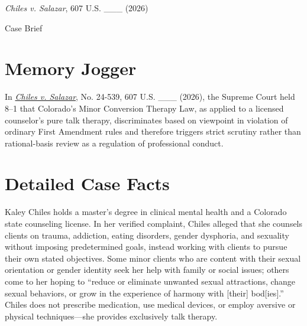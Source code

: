 \documentclass[12pt]{article}
\begin{document}
\begin{center}
{\LARGE \textit{Chiles v. Salazar}, 607 U.S. \_\_\_ (2026)\par}
\vspace{0.8em}
{\large Case Brief\par}
\end{center}
\vspace{1em}

\section{Memory Jogger}

In \href{https://www.courtlistener.com/opinion/10830655/chiles-v-salazar-revisions-33126/}{\textit{Chiles v. Salazar}}, No. 24-539, 607 U.S. \_\_\_ (2026), the Supreme Court held 8--1 that Colorado's Minor Conversion Therapy Law, as applied to a licensed counselor's pure talk therapy, discriminates based on viewpoint in violation of ordinary First Amendment rules and therefore triggers strict scrutiny rather than rational-basis review as a regulation of professional conduct.

\section{Detailed Case Facts}

Kaley Chiles holds a master's degree in clinical mental health and a Colorado state counseling license. In her verified complaint, Chiles alleged that she counsels clients on trauma, addiction, eating disorders, gender dysphoria, and sexuality without imposing predetermined goals, instead working with clients to pursue their own stated objectives. Some minor clients who are content with their sexual orientation or gender identity seek her help with family or social issues; others come to her hoping to ``reduce or eliminate unwanted sexual attractions, change sexual behaviors, or grow in the experience of harmony with [their] bod[ies].'' Chiles does not prescribe medication, use medical devices, or employ aversive or physical techniques---she provides exclusively talk therapy.
\end{document}
